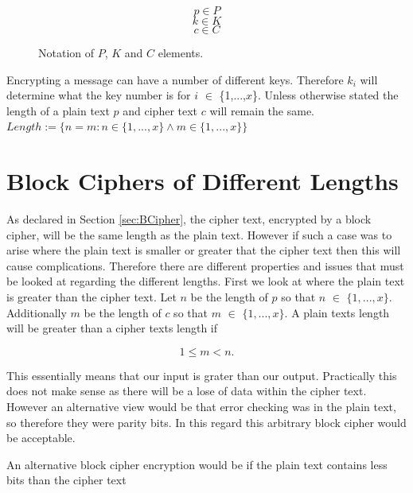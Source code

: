 \documentclass[11pt,a4paper, notitlepage]{report}
\begin{document}
\begin{figure}[h]
\label{fig:6.1notation}
\begin{displaymath}
p \in P
\end{displaymath}
\begin{displaymath}
k \in K
\end{displaymath}
\begin{displaymath}
c \in C
\end{displaymath}
\caption{Notation of $P$, $K$ and $C$ elements.}
\end{figure}

Encrypting a message can have a number of different keys. Therefore $k_{i}$ will determine what the key number is for $i$ $\in$ \{1,...,$x$\}. Unless otherwise stated the length of a plain text $p$ and cipher text $c$ will remain the same. $Length:= \{n = m : n \in \{1,...,x\} \land m \in \{1,...,x\} \}$




\section{Block Ciphers of Different Lengths}
\label{sec:Blockcipherdiff}

As declared in Section \ref{sec:BCipher}, the cipher text, encrypted by a block cipher, will be the same length as the plain text. However if such a case was to arise where the plain text is smaller or greater that the cipher text then this will cause complications. Therefore there are different properties and issues that must be looked at regarding the different lengths. First we look at where the plain text is greater than the cipher text. Let $n$ be the length of $p$ so that $n$ $\in$ $\{1,...,x\}$. Additionally $m$ be the length of $c$ so that $m$ $\in$ $\{1,...,x\}$. A plain texts length will be greater than a cipher texts length if

\begin{displaymath}
1 \leq m < n.
\end{displaymath}

This essentially means that our input is grater than our output. Practically this does not make sense as there will be a lose of data within the cipher text.  However an alternative view would be that error checking was in the plain text, so therefore they were parity bits. In this regard this arbitrary block cipher would be acceptable.

An alternative block cipher encryption would be if the plain text contains less bits than the cipher text
\end{document}
